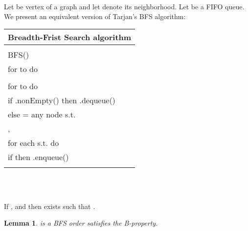 \documentclass[a4paper, 11pt]{article}
\newtheorem{lm}[tw]{Lemma}
\newenvironment{pr}[1][Property]{\begin{trivlist}
\item[\hskip \labelsep {\bfseries #1}]}{\end{trivlist}}
\begin{document}
Let  be vertex of a graph  and let  denote its neighborhood. Let  be 
a FIFO queue. We present an equivalent version of Tarjan's BFS algorithm:\\

\begin{tabular}{l}
\hline
Breadth-Frist Search algorithm\\
\hline
\\
BFS()\\
\hspace{0.5cm}  for  to  do \\
\hspace{0.5cm}  \\
\hspace{0.5cm}  for  to  do\\
\hspace{1cm}        if .nonEmpty() then .dequeue()\\
\hspace{1cm}        else  = any node s.t. \\
\hspace{1cm}        , \\
\hspace{1cm}        for each  s.t.  do\\
\hspace{1.5cm}          if  then .enqueue()\\
\\
\hline
\end{tabular}
\\
\\
\begin{pr}[Property B.]
    If ,  and  then exists  such that . 
\end{pr}

\begin{lm}
     is a BFS order   satisfies the B-property.
\end{lm}
\end{document}
